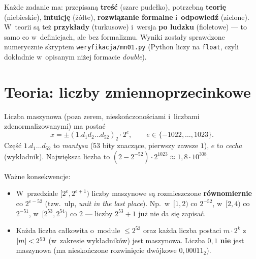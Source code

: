 \documentclass[11pt]{article}
\begin{document}

\begin{teoria}
Każde zadanie ma: przepisaną \textbf{treść} (szare pudełko), potrzebną
\textbf{teorię} (niebieskie), \textbf{intuicję} (żółte), \textbf{rozwiązanie
formalne} i~\textbf{odpowiedź} (zielone). W~teorii są też
\textbf{przykłady} (turkusowe) i~wersja \textbf{po ludzku} (fioletowe) ---
to samo co w~definicjach, ale bez formalizmu. Wyniki zostały sprawdzone
numerycznie skryptem \texttt{weryfikacja/mn01.py} (Python liczy na
\texttt{float}, czyli dokładnie w~opisanym niżej formacie \emph{double}).
\end{teoria}

\section{Teoria: liczby zmiennoprzecinkowe}

\begin{definicja}
Liczba maszynowa (poza zerem, nieskończonościami i~liczbami
zdenormalizowanymi) ma postać
\[
x=\pm(1.d_1d_2\ldots d_{52})_2\cdot 2^{e},\qquad e\in\{-1022,\ldots,1023\}.
\]
Część $1.d_1\ldots d_{52}$ to \emph{mantysa} (53 bity znaczące, pierwszy
zawsze $1$), $e$ to \emph{cecha} (wykładnik). Największa liczba to
$(2-2^{-52})\cdot2^{1023}\approx1{,}8\cdot10^{308}$.
\end{definicja}

Ważne konsekwencje:
\begin{itemize}
\item W~przedziale $[2^e,2^{e+1})$ liczby maszynowe są rozmieszczone
\textbf{równomiernie} co $2^{e-52}$ (tzw.\ $\mathrm{ulp}$, \emph{unit in the
last place}). Np.\ w~$[1,2)$ co $2^{-52}$, w~$[2,4)$ co $2^{-51}$,
w~$[2^{53},2^{54})$ co $2$ --- liczby $2^{53}+1$ już nie da się zapisać.
\item Każda liczba całkowita o~module $\le2^{53}$ oraz każda liczba postaci
$m\cdot2^{k}$ z~$\left\lvert m \right\rvert<2^{53}$ (w~zakresie wykładników) jest maszynowa.
Liczba $0{,}1$ \textbf{nie} jest maszynowa (ma nieskończone rozwinięcie
dwójkowe $0{,}0\overline{0011}_2$).
\end{itemize}
\end{document}
